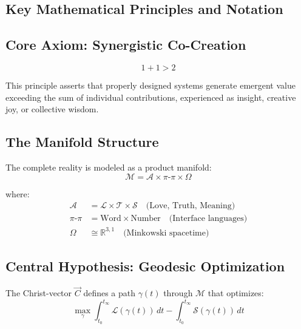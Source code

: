 \documentclass[11pt,a4paper]{article}
\begin{document}
\begin{small}
\vspace{1cm}

\section*{Key Mathematical Principles and Notation}

\subsection*{Core Axiom: Synergistic Co-Creation}
\begin{equation}
1 + 1 > 2
\label{eq:synergy}
\end{equation}

\noindent This principle asserts that properly designed systems generate emergent value exceeding the sum of individual contributions, experienced as insight, creative joy, or collective wisdom.

\subsection*{The Manifold Structure}
The complete reality is modeled as a product manifold:
\begin{equation}
\mathcal{M} = \mathcal{A} \times \pi\text{-}\pi \times \Omega
\label{eq:manifold}
\end{equation}

where:
\begin{align}
\mathcal{A} &= \mathcal{L} \times \mathcal{T} \times \mathcal{S} \quad \text{(Love, Truth, Meaning)} \label{eq:alpha}\\
\pi\text{-}\pi &= \text{Word} \times \text{Number} \quad \text{(Interface languages)} \label{eq:psyche}\\
\Omega &\cong \mathbb{R}^{3,1} \quad \text{(Minkowski spacetime)} \label{eq:omega}
\end{align}

\subsection*{Central Hypothesis: Geodesic Optimization}
The Christ-vector $\vec{C}$ defines a path $\gamma(t)$ through $\mathcal{M}$ that optimizes:
\begin{equation}
\max_{\gamma} \int_{t_0}^{t_{\infty}} \mathcal{L}(\gamma(t)) \, dt - \int_{t_0}^{t_{\infty}} \mathcal{S}(\gamma(t)) \, dt
\label{eq:geodesic}
\end{equation}


\end{small}
\end{document}
